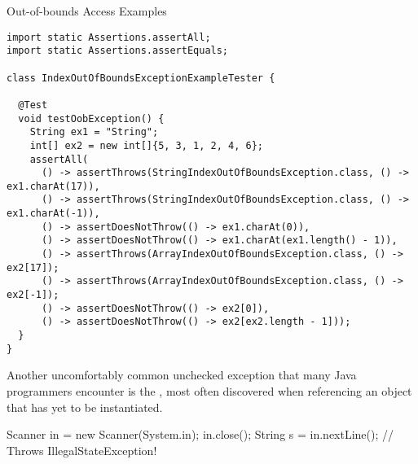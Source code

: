 \begin{cl}[]{Out-of-bounds Access Examples}
\begin{lstlisting}[language=MyJava]
import static Assertions.assertAll;
import static Assertions.assertEquals;

class IndexOutOfBoundsExceptionExampleTester {

  @Test
  void testOobException() {
    String ex1 = "String";
    int[] ex2 = new int[]{5, 3, 1, 2, 4, 6}; 
    assertAll(
      () -> assertThrows(StringIndexOutOfBoundsException.class, () -> ex1.charAt(17)),
      () -> assertThrows(StringIndexOutOfBoundsException.class, () -> ex1.charAt(-1)),
      () -> assertDoesNotThrow(() -> ex1.charAt(0)),
      () -> assertDoesNotThrow(() -> ex1.charAt(ex1.length() - 1)),
      () -> assertThrows(ArrayIndexOutOfBoundsException.class, () -> ex2[17]);
      () -> assertThrows(ArrayIndexOutOfBoundsException.class, () -> ex2[-1]);
      () -> assertDoesNotThrow(() -> ex2[0]),
      () -> assertDoesNotThrow(() -> ex2[ex2.length - 1]));
  } 
}
\end{lstlisting}
\end{cl} 

Another uncomfortably common unchecked exception that many Java programmers encounter is the , most often discovered when referencing an object that has yet to be instantiated. 


\begin{verbnobox}[\footnotesize]
Scanner in = new Scanner(System.in);
in.close();
String s = in.nextLine(); // Throws IllegalStateException!
\end{verbnobox}
